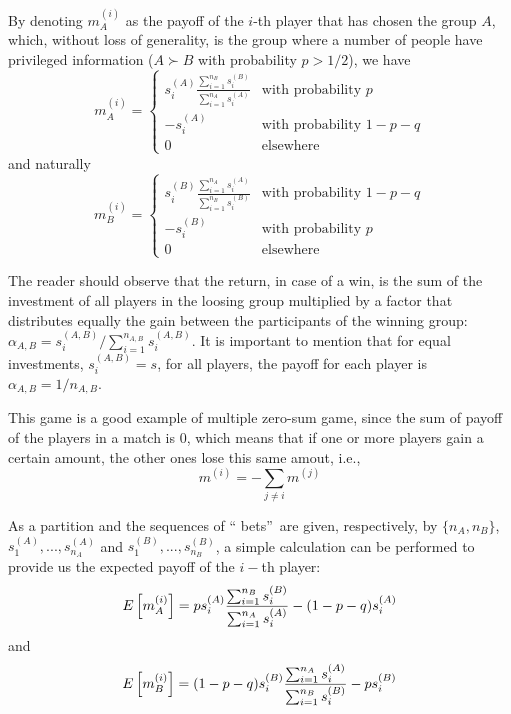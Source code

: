 \documentclass[3p, 11pt]{elsarticle}
\begin{document}
By denoting $m_{A}^{(i)}$ as the payoff of the $i$-th player that has chosen
the group $A$, which, without loss of generality, is the group where a
number of people have privileged information ($A\succ B$ with probability $%
p>1/2$), we have 
\begin{equation}
m_{A}^{(i)}=\left\{ 
\begin{array}{ll}
s_{i}^{(A)}\frac{\sum_{i=1}^{n_{B}}s_{i}^{(B)}}{\sum_{i=1}^{n_{A}}s_{i}^{(A)}%
} & \text{with probability }p \\ 
-s_{i}^{(A)} & \text{with probability }1-p-q \\ 
0 & \text{elsewhere}%
\end{array}%
\right.  \label{Eq: profit-A}
\end{equation}
and naturally 
\begin{equation}
m_{B}^{(i)}=\left\{ 
\begin{array}{ll}
s_{i}^{(B)}\frac{\sum_{i=1}^{n_{A}}s_{i}^{(A)}}{\sum_{i=1}^{n_{B}}s_{i}^{(B)}%
} & \text{with probability }1-p-q \\ 
-s_{i}^{(B)} & \text{with probability }p \\ 
0 & \text{elsewhere}%
\end{array}%
\right.  \label{Eq: profit-B}
\end{equation}

The reader should observe that the return, in case of a win, is the sum of
the investment of all players in the loosing group multiplied by a factor
that distributes equally the gain between the participants of the winning
group: $\alpha _{A,B}=s_{i}^{(A,B)}/\sum_{i=1}^{n_{A,B}}s_{i}^{(A,B)}$. It
is important to mention that for equal investments, $s_{i}^{(A,B)}=s$, for
all players, the payoff for each player is $\alpha _{A,B}=1/n_{A,B}$.

This game is a good example of multiple zero-sum game, since the sum of
payoff of the players in a match is 0, which means that if one or more
players gain a certain amount, the other ones lose this same amout, i.e., 
\begin{equation}
m^{(i)}=-\sum_{j\neq i}m^{(j)}  \label{Eq:sum_zero}
\end{equation}

As a partition and the sequences of \textquotedblleft
bets\textquotedblright\ are given, respectively, by $\{n_{A},n_{B}\}$, $%
s_{1}^{(A)},...,s_{n_{A}}^{(A)}$ and $s_{1}^{(B)},...,s_{n_{B}}^{(B)}$, a
simple calculation can be performed to provide us the expected payoff of the 
$i-$th player: 
\begin{equation}
E\left[ m_{A}^{(i)}\right] =ps_{i}^{(A)}\frac{\sum_{i=1}^{n_{B}}s_{i}^{(B)}}{%
\sum_{i=1}^{n_{A}}s_{i}^{(A)}}-(1-p-q)s_{i}^{(A)}  \label{Eq:expect_A}
\end{equation}%
and 
\begin{equation}
E\left[ m_{B}^{(i)}\right] =(1-p-q)s_{i}^{(B)}\frac{%
\sum_{i=1}^{n_{A}}s_{i}^{(A)}}{\sum_{i=1}^{n_{B}}s_{i}^{(B)}}-ps_{i}^{(B)}
\label{Eq:expect_B}
\end{equation}
\end{document}

